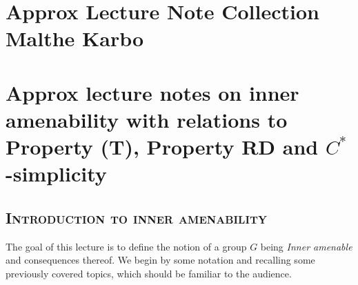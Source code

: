 \documentclass[10pt,oneside,openany,final]{memoir}
\newcommand{\sssection}[1]{%
\section[#1]{\centering\normalfont\scshape \textbf{#1}}}
\theoremstyle{definition}
\theoremstyle{Break}
\begin{document}
\chapter{Approx Lecture Note Collection\\Malthe Karbo}
\chapter{Approx lecture notes on inner amenability with relations to Property (T), Property RD and $C^*$-simplicity}
\sssection{Introduction to inner amenability}
The goal of this lecture is to define the notion of a group $G$ being \textit{Inner amenable} and consequences thereof. We begin by some notation and recalling some previously covered topics, which should be familiar to the audience.
\end{document}
